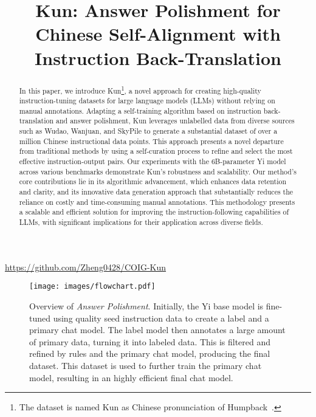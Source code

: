 \title{Kun: Answer Polishment for Chinese Self-Alignment with Instruction Back-Translation}



\maketitle

\vspace{-0.7cm}
\begin{center}
    \url{https://github.com/Zheng0428/COIG-Kun}
\end{center}
\vspace{5pt}
\begin{abstract}
In this paper, we introduce Kun\footnote{The dataset is named Kun as Chinese pronunciation of Humpback~\cite{li2023self}.}, a novel approach for creating high-quality instruction-tuning datasets for large language models (LLMs) without relying on manual annotations. 
Adapting a self-training algorithm based on instruction back-translation and answer polishment, Kun leverages unlabelled data from diverse sources such as Wudao, Wanjuan, and SkyPile to generate a substantial dataset of over a million Chinese instructional data points. 
This approach presents a novel departure from traditional methods by using a self-curation process to refine and select the most effective instruction-output pairs. 
Our experiments with the 6B-parameter Yi model across various benchmarks demonstrate Kun's robustness and scalability.
Our method's core contributions lie in its algorithmic advancement, which enhances data retention and clarity, and its innovative data generation approach that substantially reduces the reliance on costly and time-consuming manual annotations. 
This methodology presents a scalable and efficient solution for improving the instruction-following capabilities of LLMs, with significant implications for their application across diverse fields.
\end{abstract}
\begin{figure*}[t]
  \centering
    \centering
    \texttt{[image: images/flowchart.pdf]}
  \hfill
    \centering
  \caption{Overview of \textit{Answer Polishment}.
Initially, the Yi base model is fine-tuned using quality seed instruction data to create a label and a primary chat model. The label model then annotates a large amount of primary data, turning it into labeled data. This is filtered and refined by rules and the primary chat model, producing the final dataset. This dataset is used to further train the primary chat model, resulting in an highly efficient final chat model.}
  \label{fig:flowchart}
\end{figure*}

